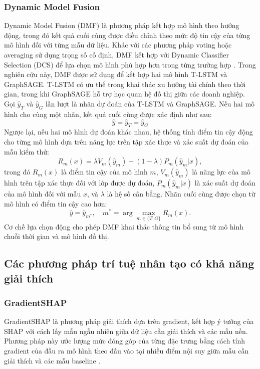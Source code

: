 \documentclass[10pt,twoside]{article}
\begin{document}
\subsubsection{Dynamic Model Fusion} Dynamic Model Fusion (DMF) là phương pháp kết hợp mô hình theo hướng động, trong đó kết quả cuối cùng được điều chỉnh theo mức độ tin cậy của từng mô hình đối với từng mẫu dữ liệu. Khác với các phương pháp voting hoặc averaging sử dụng trọng số cố định, DMF kết hợp với Dynamic Classifier Selection (DCS) để lựa chọn mô hình phù hợp hơn trong từng trường hợp \cite{toufiq_explainable_2026}. Trong nghiên cứu này, DMF được sử dụng để kết hợp hai mô hình T-LSTM và GraphSAGE. T-LSTM có ưu thế trong khai thác xu hướng tài chính theo thời gian, trong khi GraphSAGE hỗ trợ học quan hệ đồ thị giữa các doanh nghiệp. Gọi $\hat{y}_{T}$ và $\hat{y}_{G}$ lần lượt là nhãn dự đoán của T-LSTM và GraphSAGE. Nếu hai mô hình cho cùng một nhãn, kết quả cuối cùng được xác định như sau: 
\begin{equation} 
\hat{y} = \hat{y}_{T} = \hat{y}_{G} 
\end{equation} Ngược lại, nếu hai mô hình dự đoán khác nhau, hệ thống tính điểm tin cậy động cho từng mô hình dựa trên năng lực trên tập xác thực và xác suất dự đoán của mẫu kiểm thử: 
\begin{equation} 
R_m(x) = \lambda V_m(\hat{y}_m) + (1-\lambda) P_m(\hat{y}_m|x), 
\end{equation} trong đó $R_m(x)$ là điểm tin cậy của mô hình $m$, $V_m(\hat{y}_m)$ là năng lực của mô hình trên tập xác thực đối với lớp được dự đoán, $P_m(\hat{y}_m|x)$ là xác suất dự đoán của mô hình đối với mẫu $x$, và $\lambda$ là hệ số cân bằng. Nhãn cuối cùng được chọn từ mô hình có điểm tin cậy cao hơn: 
\begin{equation} 
\hat{y} = \hat{y}_{m^*}, \quad m^* = \arg\max_{m \in \{T,G\}} R_m(x). 
\end{equation} Cơ chế lựa chọn động cho phép DMF khai thác thông tin bổ sung từ mô hình chuỗi thời gian và mô hình đồ thị.
\subsection{Các phương pháp trí tuệ nhân tạo có khả năng giải thích}
\subsubsection{GradientSHAP} 
GradientSHAP là phương pháp giải thích dựa trên gradient, kết hợp ý tưởng của SHAP với cách lấy mẫu ngẫu nhiên giữa dữ liệu cần giải thích và các mẫu nền. Phương pháp này ước lượng mức đóng góp của từng đặc trưng bằng cách tính gradient của đầu ra mô hình theo đầu vào tại nhiều điểm nội suy giữa mẫu cần giải thích và các mẫu baseline \cite{lundberg_unified_2017, kokhlikyan_captum_2020}. 
\end{document}
